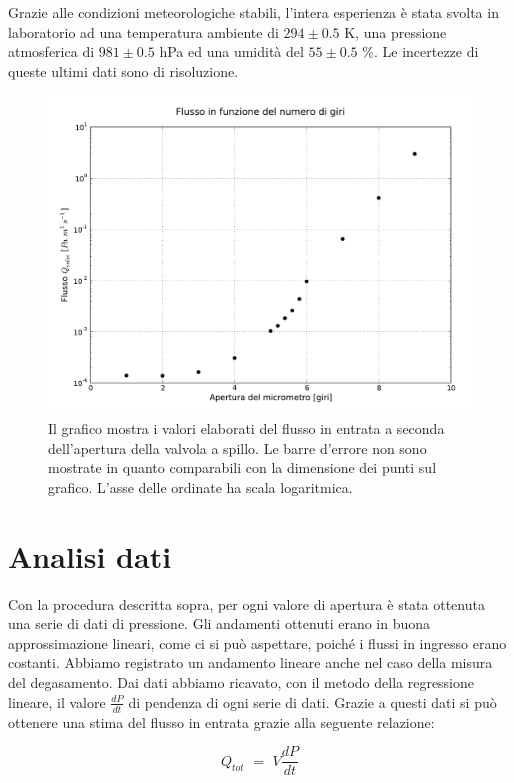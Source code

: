 Grazie alle condizioni meteorologiche stabili, l'intera esperienza è stata svolta in laboratorio ad una temperatura ambiente di $294 \pm 0.5$ \si{\kelvin}, una pressione atmosferica di $981 \pm 0.5$ hPa ed una umidità del $55 \pm 0.5$ \%. Le incertezze di queste ultimi dati sono di risoluzione.

\begin{figure}[h!]
    \includegraphics[width=14cm]{graph.pdf}
    \caption{Il grafico mostra i valori elaborati del flusso in entrata a seconda dell'apertura della valvola a spillo. Le barre d'errore non sono
    mostrate in quanto comparabili con la dimensione dei punti sul grafico. L'asse delle ordinate ha scala logaritmica.}
    \label{fig:graph}
\end{figure}

\section{Analisi dati}

Con la procedura descritta sopra, per ogni valore di apertura è stata ottenuta una serie di dati di pressione.
Gli andamenti ottenuti erano in buona approssimazione lineari, come ci si può aspettare, poiché i flussi in ingresso erano costanti.
Abbiamo registrato un andamento lineare anche nel caso della misura del degasamento.
Dai dati abbiamo ricavato, con il metodo della regressione lineare, il valore $\frac{dP}{dt}$ di pendenza di ogni serie di dati.
Grazie a questi dati si può ottenere una stima del flusso in entrata grazie alla seguente relazione:

\begin{equation}
	Q_{tot} \,\, = \,\, V \frac{dP}{dt}
\end{equation}

